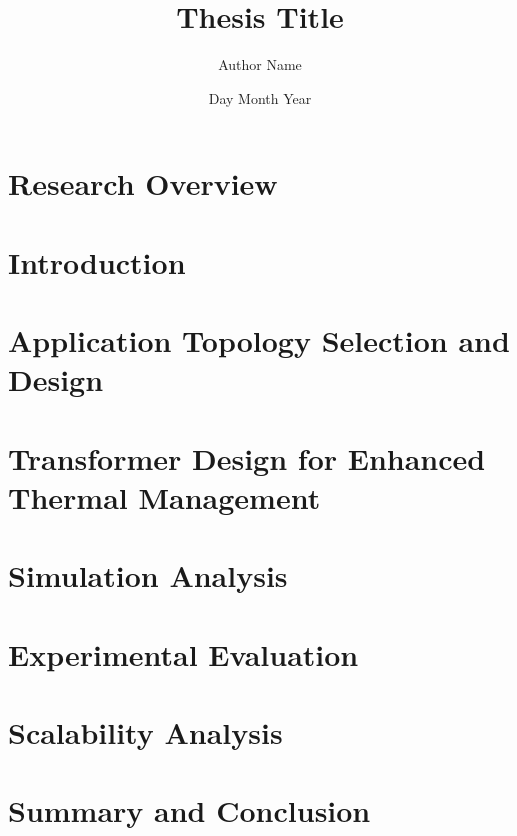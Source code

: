 \documentclass[12pt]{report}
\title{Thesis Title}
\author{Author Name}
\date{Day Month Year}
\begin{document}





\tableofcontents


\listoffigures


\listoftables

\doublespacing

\chapter*{Research Overview}


\chapter{Introduction}



\chapter{Application Topology Selection and Design}


\chapter{Transformer Design for Enhanced Thermal Management} \label{Chapter 3}


\chapter{Simulation Analysis}


\chapter{Experimental Evaluation} \label{chap5}


\chapter{Scalability Analysis}



\chapter{Summary and Conclusion}

\end{document}
